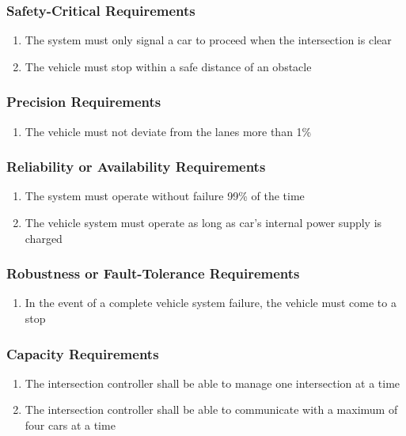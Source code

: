 \documentclass [11pt]{article}
\begin{document}
\subsubsection{Safety-Critical Requirements }
	\begin{enumerate}[label=\textbf{\Alph*}:]
		\item The system must only signal a car to proceed when the intersection is clear
		\item The vehicle must stop within a safe distance of an obstacle
	\end{enumerate}	


\subsubsection{Precision Requirements}
	\begin{enumerate}[label=\textbf{\Alph*}:]
		\item The vehicle must not deviate from the lanes more than 1\%
	\end{enumerate}

\subsubsection{Reliability or Availability  Requirements}
	\begin{enumerate}[label=\textbf{\Alph*}:]
		\item The system must operate without failure 99\% of the time
		\item The vehicle system must operate as long as car's internal power supply is charged
	\end{enumerate}



\subsubsection{Robustness or Fault-Tolerance Requirements }
	\begin{enumerate}[label=\textbf{\Alph*}:]
		\item In the event of a complete vehicle system failure, the vehicle must come to a stop
	\end{enumerate}
	
\subsubsection{Capacity Requirements }
	\begin{enumerate}[label=\textbf{\Alph*}:]
		\item The intersection controller shall be able to manage one intersection at a time
		\item The intersection controller shall be able to communicate with a maximum of four cars at a time
	\end{enumerate}
\end{document}
